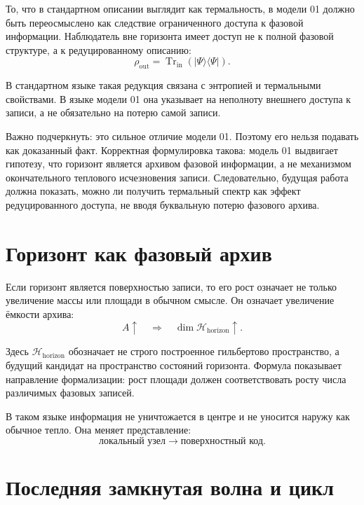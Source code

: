 \documentclass[11pt,a4paper]{article}
\begin{document}
То, что в стандартном описании выглядит как термальность, в модели 01 должно быть переосмыслено как следствие ограниченного доступа к фазовой информации. Наблюдатель вне горизонта имеет доступ не к полной фазовой структуре, а к редуцированному описанию:
\begin{equation}
\rho_{\mathrm{out}} = \operatorname{Tr}_{\mathrm{in}}\left(|\Psi\rangle\langle\Psi|\right).
\end{equation}

В стандартном языке такая редукция связана с энтропией и термальными свойствами. В языке модели 01 она указывает на неполноту внешнего доступа к записи, а не обязательно на потерю самой записи.

Важно подчеркнуть: это сильное отличие модели 01. Поэтому его нельзя подавать как доказанный факт. Корректная формулировка такова: модель 01 выдвигает гипотезу, что горизонт является архивом фазовой информации, а не механизмом окончательного теплового исчезновения записи. Следовательно, будущая работа должна показать, можно ли получить термальный спектр как эффект редуцированного доступа, не вводя буквальную потерю фазового архива.

\section{Горизонт как фазовый архив}

Если горизонт является поверхностью записи, то его рост означает не только увеличение массы или площади в обычном смысле. Он означает увеличение ёмкости архива:
\begin{equation}
A \uparrow \quad \Rightarrow \quad \dim \mathcal{H}_{\mathrm{horizon}} \uparrow.
\end{equation}

Здесь $\mathcal{H}_{\mathrm{horizon}}$ обозначает не строго построенное гильбертово пространство, а будущий кандидат на пространство состояний горизонта. Формула показывает направление формализации: рост площади должен соответствовать росту числа различимых фазовых записей.

В таком языке информация не уничтожается в центре и не уносится наружу как обычное тепло. Она меняет представление:
\begin{equation}
\text{локальный узел} \longrightarrow \text{поверхностный код}.
\end{equation}

\section{Последняя замкнутая волна и цикл}
\end{document}
